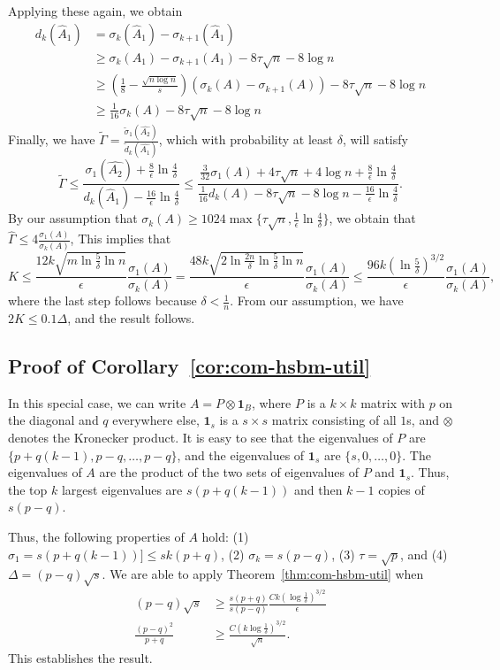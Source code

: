 Applying these again, we obtain
\begin{align*}
    d_k(\hat{A}_1) &= \sigma_{k}(\hat{A}_1) - \sigma_{k+1}(\hat{A}_1) \\
    &\geq \sigma_k(A_1) - \sigma_{k+1}(A_1) - 8\tau \sqrt{n} - 8\log n \\
    &\geq (\frac{1}{8}-\frac{\sqrt{n \log n}}{s})(\sigma_k(A) - \sigma_{k+1}(A)) - 8\tau \sqrt{n} - 8\log n \\
    &\geq \frac{1}{16}\sigma_k(A) - 8\tau \sqrt{n} - 8\log n
\end{align*}
Finally, we have $\tilde{\Gamma} = \frac{\tilde{\sigma}_1(\hat{A_2})}{\tilde{d}_k(\hat{A_1})}$, which with probability at least $\delta$, will satisfy
\[
\tilde{\Gamma} \leq \frac{\sigma_1(\hat{A_2}) + \frac{8}{\epsilon} \ln \frac{4}{\delta} }{d_k(\hat{A}_1) - \frac{16}{\epsilon} \ln \frac{4}{\delta}} \leq 
\frac{\frac{3}{32} \sigma_1(A) + 4\tau \sqrt{n} + 4 \log n + \frac{8}{\epsilon} \ln \frac{4}{\delta} }{\frac{1}{16}d_k(A) - 8\tau \sqrt{n} - 8\log n - \frac{16}{\epsilon} \ln \frac{4}{\delta}}.
\]
By our assumption that $\sigma_k(A) \geq 1024 \max \{\tau \sqrt{n}, \frac{1}{\epsilon} \ln \frac{4}{\delta} \}$, we obtain that $\hat{\Gamma} \leq 4 \frac{\sigma_1(A)}{\sigma_k(A)}$, 
This implies that 
\[
    K \leq \frac{12k \sqrt{m\ln \frac{5}{\delta} \ln n}}{\epsilon} \frac{\sigma_1(A)}{\sigma_k(A)} = \frac{48k \sqrt{2 \ln \frac{2n}{\delta} \ln \frac{5}{\delta} \ln n}}{\epsilon} \frac{\sigma_1(A)}{\sigma_k(A)}
    \leq \frac{96k (\ln \frac{5}{\delta})^{3/2}}{\epsilon} \frac{\sigma_1(A)}{\sigma_k(A)},
\]
where the last step follows because $\delta < \frac{1}{n}$. From our assumption, we have $2K \leq 0.1\Delta$, and the result follows.

\subsection{Proof of Corollary~\ref{cor:com-hsbm-util}}

In this special case, we can write $A = P \otimes \textbf{1}_B$, where $P$ is a $k \times k$ matrix with $p$ on the diagonal and $q$ everywhere else, $\textbf{1}_s$ is a $s \times s$ matrix consisting of all $1$s, and $\otimes$ denotes the Kronecker product. It is easy to see that the eigenvalues of $P$ are $\{p + q(k-1), p-q, \ldots, p-q\}$, and the eigenvalues of $\textbf{1}_s$ are $\{s, 0, \ldots, 0\}$. The eigenvalues of $A$ are the product of the two sets of eigenvalues of $P$ and $\textbf{1}_s$. Thus, the top $k$ largest eigenvalues are $s(p + q(k-1))$ and then $k-1$ copies of $s(p-q)$.

Thus, the following properties of $A$ hold: (1) $\sigma_1 = s(p + q(k-1)) ] \leq sk (p + q)$, (2) $\sigma_k = s(p-q)$, (3) $\tau = \sqrt{p}$, and (4) $\Delta = (p-q)\sqrt{s}$. We are able to apply Theorem~\ref{thm:com-hsbm-util} when 
\begin{align*}
    (p-q) \sqrt{s} &\geq \frac{s(p+q)}{s(p-q)} \frac{Ck(\log \frac{1}{\delta})^{3/2}}{\epsilon} \\
    \frac{(p-q)^2}{p+q} &\geq \frac{C(k\log \frac{1}{\delta})^{3/2}}{\sqrt{n}}.
\end{align*}
This establishes the result.
